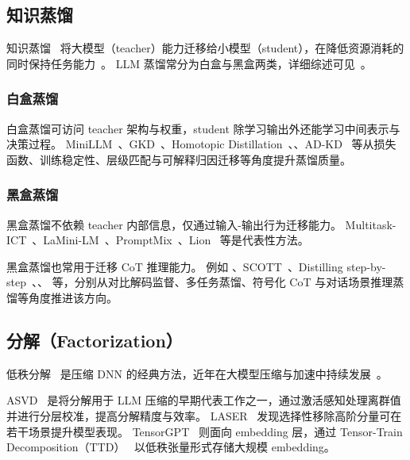 \subsection{知识蒸馏}

知识蒸馏~\citep{hinton2015distilling,gou2021knowledge} 将大模型（teacher）能力迁移给小模型（student），在降低资源消耗的同时保持任务能力~\citep{gou2021knowledge,shang2021lipschitz}。
LLM 蒸馏常分为白盒与黑盒两类，详细综述可见~\citep{xu2024kdsurvey}。

\subsubsection{白盒蒸馏}
白盒蒸馏可访问 teacher 架构与权重，student 除学习输出外还能学习中间表示与决策过程。
MiniLLM~\citep{gu2023knowledge}、GKD~\citep{agarwal2023gkd}、Homotopic Distillation~\citep{liang2023homodistil}、\cite{liang2023less}、AD-KD~\citep{wu2023ad} 等从损失函数、训练稳定性、层级匹配与可解释归因迁移等角度提升蒸馏质量。

\subsubsection{黑盒蒸馏}
黑盒蒸馏不依赖 teacher 内部信息，仅通过输入-输出行为迁移能力。
Multitask-ICT~\citep{huang2022context}、LaMini-LM~\citep{wu2023lamini}、PromptMix~\cite{sahu2023promptmix}、Lion~\citep{jiang2023lion} 等是代表性方法。

黑盒蒸馏也常用于迁移 CoT 推理能力。
例如 \cite{fu2023specializing}、SCOTT~\citep{wang2023scott}、Distilling step-by-step~\citep{hsieh2023distilling}、\cite{li2023symbolic}、\cite{chae2023dialogue} 等，分别从对比解码监督、多任务蒸馏、符号化 CoT 与对话场景推理蒸馏等角度推进该方向。

\subsection{分解（Factorization）}

低秩分解~\citep{kishore2017literature} 是压缩 DNN 的经典方法，近年在大模型压缩与加速中持续发展~\citep{schotthofer2022low}。

ASVD~\citep{yuan2023asvd} 是将分解用于 LLM 压缩的早期代表工作之一，通过激活感知处理离群值并进行分层校准，提高分解精度与效率。
LASER~\citep{sharma2023truth} 发现选择性移除高阶分量可在若干场景提升模型表现。
TensorGPT~\citep{xu2023tensorgpt} 则面向 embedding 层，通过 Tensor-Train Decomposition（TTD）~\citep{oseledets2011tensor} 以低秩张量形式存储大规模 embedding。

